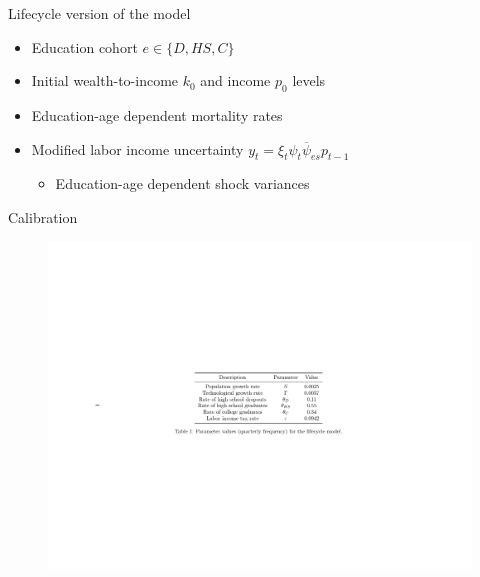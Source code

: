 \documentclass{beamer}
\begin{document}
 
\begin{frame}{Lifecycle version of the model}
\begin{itemize}
\item Education cohort $e \in \{D, HS, C\}$
\item Initial wealth-to-income $k_0$ and income $p_0$ levels 
\item Education-age dependent mortality rates 
\par \parencite{Brown2007}
\item Modified labor income uncertainty $y_t = \xi_t \psi_t \overline{\psi}_{es} p_{t-1}$ 
\par \parencite{Cagetti2003}
\begin{itemize}
\item Education-age dependent shock variances 
\par \parencite{Sabelhaus2010}
\end{itemize}
\end{itemize}
\end{frame}

\begin{frame}{Calibration}
  \vfill
   \begin{figure}
    \centering
    \includegraphics[width=.85\linewidth, scale=1.5]{Tables/calibrationLC.pdf}
  \end{figure}
  \vfill
\end{frame}
\end{document}
